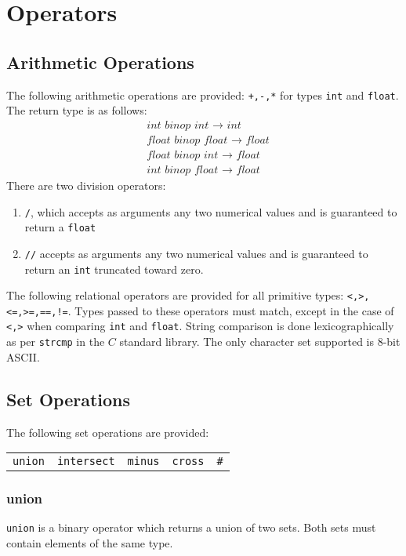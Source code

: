 \section{Operators}
\subsection{Arithmetic Operations}
The following arithmetic operations are provided: \verb|+,-,*| for types \verb|int| and \verb|float|. The return type is as follows:
	\begin{align*}
		&\textit{int binop int $\to$ int}\\
		&\textit{float binop float $\to$ float}\\
		&\textit{float binop int $\to$ float}\\
		&\textit{int  binop float $\to$ float}
	\end{align*}
There are two division operators:
\begin{enumerate}
\item
\verb|/|, which accepts as arguments any two numerical values and is guaranteed to return a \verb|float| 
\item 
\verb|//| accepts as arguments any two numerical values and is guaranteed to return an \verb|int| truncated toward zero. 
\end{enumerate}
  
	
The following relational operators are provided for all primitive types: \verb|<,>,<=,>=,==,!=|.  Types passed to these operators must match, except in the case of \verb|<,>| when comparing \verb|int| and \verb|float|.  String comparison is done lexicographically as per \verb|strcmp| in the $C$ standard library.  The only character set supported is 8-bit ASCII.

\subsection{Set Operations}
The following set operations are provided:
	\begin{center}	
	\begin{tabular}{lllll}
	\verb|union| &\verb|intersect| &\verb|minus| &\verb|cross| &\verb|#|
	\end{tabular}
	\end{center}
\subsubsection*{union}
\verb|union| is a binary operator which returns a union of two sets.  Both sets must contain elements of the same type.
